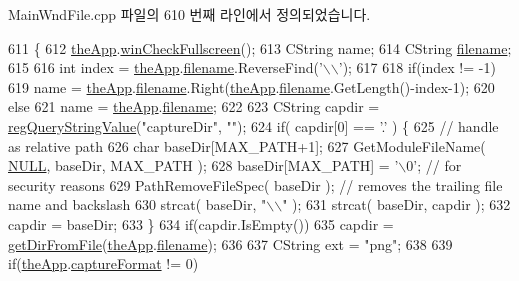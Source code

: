 Main\+Wnd\+File.\+cpp 파일의 610 번째 라인에서 정의되었습니다.


\begin{DoxyCode}
611 \{
612   \mbox{\hyperlink{_v_b_a_8cpp_a8095a9d06b37a7efe3723f3218ad8fb3}{theApp}}.\mbox{\hyperlink{class_v_b_a_a340eaeeb7fcfc242f08ac3442d991a96}{winCheckFullscreen}}();
613   CString name;
614   CString \mbox{\hyperlink{_s_d_l_8cpp_ac33a174c39700095ca0f892624d85a3f}{filename}};
615 
616   \textcolor{keywordtype}{int} index = \mbox{\hyperlink{_v_b_a_8cpp_a8095a9d06b37a7efe3723f3218ad8fb3}{theApp}}.\mbox{\hyperlink{class_v_b_a_a66eee6b61ec8bee20f21164cb0c37d2d}{filename}}.ReverseFind(\textcolor{charliteral}{'\(\backslash\)\(\backslash\)'});
617 
618   \textcolor{keywordflow}{if}(index != -1)
619     name = \mbox{\hyperlink{_v_b_a_8cpp_a8095a9d06b37a7efe3723f3218ad8fb3}{theApp}}.\mbox{\hyperlink{class_v_b_a_a66eee6b61ec8bee20f21164cb0c37d2d}{filename}}.Right(\mbox{\hyperlink{_v_b_a_8cpp_a8095a9d06b37a7efe3723f3218ad8fb3}{theApp}}.\mbox{\hyperlink{class_v_b_a_a66eee6b61ec8bee20f21164cb0c37d2d}{filename}}.GetLength()-index-1);
620   \textcolor{keywordflow}{else}
621     name = \mbox{\hyperlink{_v_b_a_8cpp_a8095a9d06b37a7efe3723f3218ad8fb3}{theApp}}.\mbox{\hyperlink{class_v_b_a_a66eee6b61ec8bee20f21164cb0c37d2d}{filename}};
622 
623   CString capdir = \mbox{\hyperlink{_reg_8cpp_a618826d274df0d9c19fab2ff28bd9008}{regQueryStringValue}}(\textcolor{stringliteral}{"captureDir"}, \textcolor{stringliteral}{""});
624   \textcolor{keywordflow}{if}( capdir[0] == \textcolor{charliteral}{'.'} ) \{
625       \textcolor{comment}{// handle as relative path}
626       \textcolor{keywordtype}{char} baseDir[MAX\_PATH+1];
627       GetModuleFileName( \mbox{\hyperlink{getopt1_8c_a070d2ce7b6bb7e5c05602aa8c308d0c4}{NULL}}, baseDir, MAX\_PATH );
628       baseDir[MAX\_PATH] = \textcolor{charliteral}{'\(\backslash\)0'}; \textcolor{comment}{// for security reasons}
629       PathRemoveFileSpec( baseDir ); \textcolor{comment}{// removes the trailing file name and backslash}
630       strcat( baseDir, \textcolor{stringliteral}{"\(\backslash\)\(\backslash\)"} );
631       strcat( baseDir, capdir );
632       capdir = baseDir;
633     \}
634   \textcolor{keywordflow}{if}(capdir.IsEmpty())
635     capdir = \mbox{\hyperlink{class_main_wnd_a55c4858ec2c3f621790c9c7aec67011e}{getDirFromFile}}(\mbox{\hyperlink{_v_b_a_8cpp_a8095a9d06b37a7efe3723f3218ad8fb3}{theApp}}.\mbox{\hyperlink{class_v_b_a_a66eee6b61ec8bee20f21164cb0c37d2d}{filename}});
636 
637   CString ext = \textcolor{stringliteral}{"png"};
638 
639   \textcolor{keywordflow}{if}(\mbox{\hyperlink{_v_b_a_8cpp_a8095a9d06b37a7efe3723f3218ad8fb3}{theApp}}.\mbox{\hyperlink{class_v_b_a_a103f0b25433c57c4458a208a06799cf8}{captureFormat}} != 0)

\end{DoxyCode}
